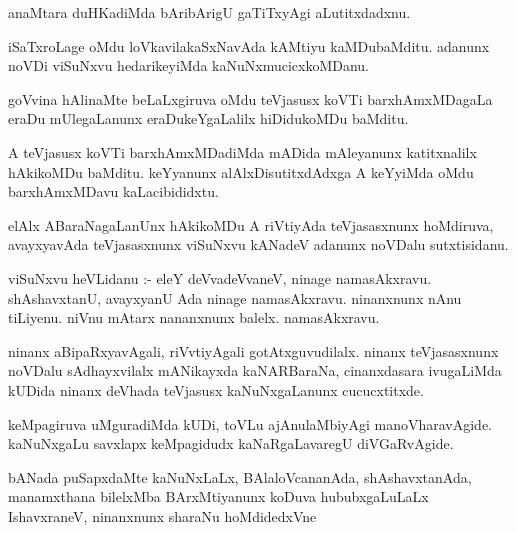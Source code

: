 \documentclass{article}
\begin{document}
\begin{mn}
anaMtara  duHKadiMda  bAribArigU  gaTiTxyAgi  aLutitxdadxnu.
\end{mn}

\begin{mn}
iSaTxroLage  oMdu  loVkavilakaSxNavAda  kAMtiyu  kaMDubaMditu.  adanunx  noVDi  viSuNxvu  hedarikeyiMda  kaNuNxmucicxkoMDanu.
\end{mn}

\begin{mn}
goVvina  hAlinaMte  beLaLxgiruva  oMdu  teVjasusx  koVTi barxhAmxMDagaLa  eraDu  mUlegaLanunx  
eraDukeYgaLalilx  hiDidukoMDu  baMditu.
\end{mn}

\begin{mn}
A  teVjasusx  koVTi  barxhAmxMDadiMda  mADida  mAleyanunx  katitxnalilx  hAkikoMDu  baMditu.  keYyanunx  
alAlxDisutitxdAdxga  A  keYyiMda  oMdu  barxhAmxMDavu  kaLacibididxtu.
\end{mn}

\begin{mn}
elAlx  ABaraNagaLanUnx  hAkikoMDu  A  riVtiyAda  teVjasasxnunx  hoMdiruva,  avayxyavAda  teVjasasxnunx  viSuNxvu  kANadeV  adanunx  noVDalu  sutxtisidanu.
\end{mn}

\begin{mn}
viSuNxvu  heVLidanu :-  eleY  deVvadeVvaneV,  ninage  namasAkxravu.  shAshavxtanU,  avayxyanU  Ada  ninage  
namasAkxravu.  ninanxnunx  nAnu  tiLiyenu.  niVnu  mAtarx  nananxnunx  balelx.  namasAkxravu.
\end{mn}

\begin{mn}
ninanx  aBipaRxyavAgali,  riVvtiyAgali  gotAtxguvudilalx.  ninanx  teVjasasxnunx  noVDalu  sAdhayxvilalx  
mANikayxda  kaNARBaraNa,  cinanxdasara  ivugaLiMda  kUDida  ninanx  deVhada  teVjasusx  kaNuNxgaLanunx  cucucxtitxde.
\end{mn}

\begin{mn}
keMpagiruva  uMguradiMda  kUDi,  toVLu  ajAnulaMbiyAgi  manoVharavAgide.  kaNuNxgaLu  savxlapx  keMpagidudx  
kaNaRgaLavaregU  diVGaRvAgide.
\end{mn}

\begin{mn}
bANada  puSapxdaMte  kaNuNxLaLx,  BAlaloVcananAda,  shAshavxtanAda,  manamxthana  bilelxMba  BArxMtiyanunx  koDuva  
hububxgaLuLaLx  IshavxraneV,  ninanxnunx  sharaNu  hoMdidedxVne
\end{mn}
\end{document}
